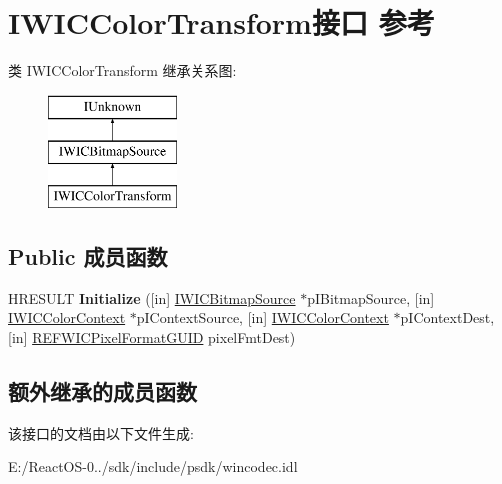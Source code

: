 \hypertarget{interface_i_w_i_c_color_transform}{}\section{I\+W\+I\+C\+Color\+Transform接口 参考}
\label{interface_i_w_i_c_color_transform}
类 I\+W\+I\+C\+Color\+Transform 继承关系图\+:\begin{figure}[H]
\begin{center}
\leavevmode
\includegraphics[height=3.000000cm]{interface_i_w_i_c_color_transform}
\end{center}
\end{figure}
\subsection*{Public 成员函数}
\begin{DoxyCompactItemize}
\item 
\mbox{\label{interface_i_w_i_c_color_transform_a18c58d1f68904c12a3ab5a9057950400}} 
H\+R\+E\+S\+U\+LT {\bfseries Initialize} (\mbox{[}in\mbox{]} \hyperlink{interface_i_w_i_c_bitmap_source}{I\+W\+I\+C\+Bitmap\+Source} $\ast$p\+I\+Bitmap\+Source, \mbox{[}in\mbox{]} \hyperlink{interface_i_w_i_c_color_context}{I\+W\+I\+C\+Color\+Context} $\ast$p\+I\+Context\+Source, \mbox{[}in\mbox{]} \hyperlink{interface_i_w_i_c_color_context}{I\+W\+I\+C\+Color\+Context} $\ast$p\+I\+Context\+Dest, \mbox{[}in\mbox{]} \hyperlink{struct___g_u_i_d}{R\+E\+F\+W\+I\+C\+Pixel\+Format\+G\+U\+ID} pixel\+Fmt\+Dest)
\end{DoxyCompactItemize}
\subsection*{额外继承的成员函数}


该接口的文档由以下文件生成\+:\begin{DoxyCompactItemize}
\item 
E\+:/\+React\+O\+S-\/0../sdk/include/psdk/wincodec.\+idl\end{DoxyCompactItemize}
